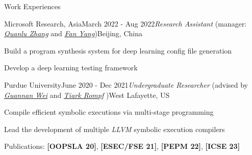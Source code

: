\documentclass{resume} %
\begin{document}
\begin{rSection}{Work Experiences}
\begin{rSubsection}{Microsoft Research, Asia}{March 2022 - Aug 2022}{\textit{Research Assistant} (manager: \href{https://www.microsoft.com/en-us/research/people/quzha/}{\textit{Quanlu Zhang}} and \href{https://www.microsoft.com/en-us/research/people/fanyang/}{\textit{Fan Yang}})}{Beijing, China}
    \item Build a program synthesis system for deep learning config file generation
    \item Develop a deep learning testing framework
\end{rSubsection}


\begin{rSubsection}{Purdue University}{June 2020 - Dec 2021}{\textit{Undergraduate Researcher} (advised by \href{http://continuation.passing.style/}{\textit{Guannan Wei}} and \href{http://tiarkrompf.github.io/}{\textit{Tiark Rompf}} )}{West Lafayette, US}
\item Compile efficient symbolic executions via multi-stage programming
\item Lead the development of multiple \textit{LLVM} symbolic execution compilers
\item Publications: \textbf{[OOPSLA 20]}, \textbf{[ESEC/FSE 21]}, \textbf{[PEPM 22]}, \textbf{[ICSE 23]}

\end{rSubsection}

\end{rSection}



\end{document}
